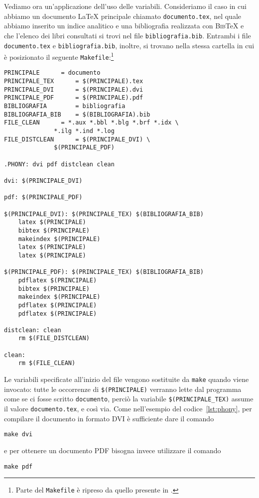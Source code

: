 Vediamo ora un'applicazione dell'uso delle variabili.  Consideriamo il caso in
cui abbiamo un documento \LaTeX{}
principale chiamato \verb|documento.tex|, nel quale abbiamo inserito un indice
analitico e una bibliografia realizzata con \textsc{Bib}\TeX{}
e che l'elenco dei libri consultati si trovi nel file \verb|bibliografia.bib|.
Entrambi i file \verb|documento.tex| e \verb|bibliografia.bib|, inoltre, si
trovano nella stessa cartella in cui è posizionato il seguente
\verb|Makefile|:\footnote{Parte del \texttt{Makefile} è ripreso da quello
  presente in \textcite[61]{caucci:tabelle}.}
\begin{lstlisting}[caption={Esempio di \texttt{Makefile} che utilizza le
variabili},label=lst:variabili]
PRINCIPALE 		= documento
PRINCIPALE_TEX		= $(PRINCIPALE).tex
PRINCIPALE_DVI		= $(PRINCIPALE).dvi
PRINCIPALE_PDF		= $(PRINCIPALE).pdf
BIBLIOGRAFIA		= bibliografia
BIBLIOGRAFIA_BIB	= $(BIBLIOGRAFIA).bib
FILE_CLEAN		= *.aux *.bbl *.blg *.brf *.idx \
			  *.ilg *.ind *.log
FILE_DISTCLEAN		= $(PRINCIPALE_DVI) \
			  $(PRINCIPALE_PDF)

.PHONY: dvi pdf distclean clean

dvi: $(PRINCIPALE_DVI)

pdf: $(PRINCIPALE_PDF)

$(PRINCIPALE_DVI): $(PRINCIPALE_TEX) $(BIBLIOGRAFIA_BIB)
	latex $(PRINCIPALE)
	bibtex $(PRINCIPALE)
	makeindex $(PRINCIPALE)
	latex $(PRINCIPALE)
	latex $(PRINCIPALE)

$(PRINCIPALE_PDF): $(PRINCIPALE_TEX) $(BIBLIOGRAFIA_BIB)
	pdflatex $(PRINCIPALE)
	bibtex $(PRINCIPALE)
	makeindex $(PRINCIPALE)
	pdflatex $(PRINCIPALE)
	pdflatex $(PRINCIPALE)

distclean: clean
	rm $(FILE_DISTCLEAN)

clean:
	rm $(FILE_CLEAN)
\end{lstlisting}
Le variabili specificate all'inizio del file vengono sostituite da \verb|make|
quando viene invocato: tutte le occorrenze di
\verb|$(PRINCIPALE)| verranno lette dal programma come se ci fosse scritto
\verb|documento|, perciò la variabile \verb|$(PRINCIPALE_TEX)|
assume il valore \verb|documento.tex|, e così via. Come nell'esempio del
codice~\ref{lst:phony}, per compilare il documento in formato \textsc{DVI} è
sufficiente dare il comando
\begin{verbatim}
make dvi
\end{verbatim}
e per ottenere un documento \textsc{PDF} bisogna invece utilizzare il comando
\begin{verbatim}
make pdf
\end{verbatim}

